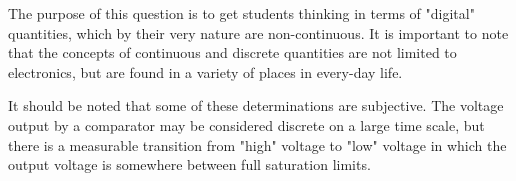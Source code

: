





The purpose of this question is to get students thinking in terms of "digital" quantities, which by their very nature are non-continuous.  It is important to note that the concepts of continuous and discrete quantities are not limited to electronics, but are found in a variety of places in every-day life.

It should be noted that some of these determinations are subjective.  The voltage output by a comparator may be considered discrete on a large time scale, but there is a measurable transition from "high" voltage to "low" voltage in which the output voltage is somewhere between full saturation limits.




